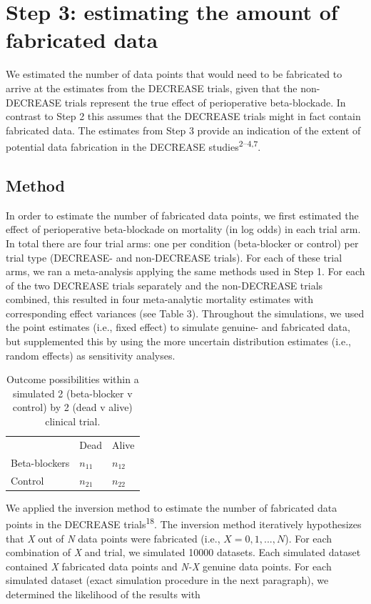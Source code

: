 \documentclass[]{article}
\begin{document}
\section{Step 3: estimating the amount of fabricated
data}\label{step-3-estimating-the-amount-of-fabricated-data}

We estimated the number of data points that would need to be fabricated
to arrive at the estimates from the DECREASE trials, given that the
non-DECREASE trials represent the true effect of perioperative
beta-blockade. In contrast to Step 2 this assumes that the DECREASE
trials might in fact contain fabricated data. The estimates from Step 3
provide an indication of the extent of potential data fabrication in the
DECREASE studies\textsuperscript{2--4,7}.

\subsection{Method}\label{method-1}

In order to estimate the number of fabricated data points, we first
estimated the effect of perioperative beta-blockade on mortality (in log
odds) in each trial arm. In total there are four trial arms: one per
condition (beta-blocker or control) per trial type (DECREASE- and
non-DECREASE trials). For each of these trial arms, we ran a
meta-analysis applying the same methods used in Step 1. For each of the
two DECREASE trials separately and the non-DECREASE trials combined,
this resulted in four meta-analytic mortality estimates with
corresponding effect variances (see Table 3). Throughout the
simulations, we used the point estimates (i.e., fixed effect) to
simulate genuine- and fabricated data, but supplemented this by using
the more uncertain distribution estimates (i.e., random effects) as
sensitivity analyses.

\begin{longtable}[]{@{}lll@{}}
\caption{Outcome possibilities within a simulated 2 (beta-blocker v
control) by 2 (dead v alive) clinical trial.}\tabularnewline
\toprule
& Dead & Alive\tabularnewline
Beta-blockers & \(n_{11}\) & \(n_{12}\)\tabularnewline
Control & \(n_{21}\) & \(n_{22}\)\tabularnewline
\bottomrule
\end{longtable}

We applied the inversion method to estimate the number of fabricated
data points in the DECREASE trials\textsuperscript{18}. The inversion
method iteratively hypothesizes that \emph{X} out of \emph{N} data
points were fabricated (i.e., \(X={0, 1, ..., N}\)). For each
combination of \emph{X} and trial, we simulated 10000 datasets. Each
simulated dataset contained \emph{X} fabricated data points and
\emph{N-X} genuine data points. For each simulated dataset (exact
simulation procedure in the next paragraph), we determined the
likelihood of the results with
\end{document}
